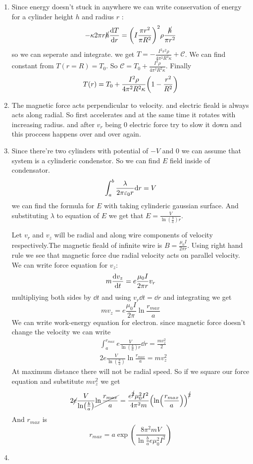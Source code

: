 \begin{sol}
    \begin{enumerate}[label=\textbf{(\alph*)}]
        \item 
        Since energy doesn't stuck in anywhere we can write conservation of energy for a cylinder height $h$ and radius $r$ : 
        $$-\kappa 2\pi r\cancel{h}\dv{T}{r}=\qty(I\frac{\pi r^2}{\pi R^2})^2\rho\frac{\cancel{h}}{\pi r^2}$$
        so we can seperate and integrate. we get $T=-\frac{I^2r^2\rho}{4\pi^2 R^4\kappa}+\mathcal{C}$. We can find constant from $T(r=R)=T_0$. So 
        $\mathcal{C}= T_0+\frac{I^2\rho}{4\pi^2 R^2\kappa}$. Finally $$T(r)=T_0+\frac{I^2\rho}{4\pi^2 R^2\kappa}\qty(1-\frac{r^2}{R^2})$$
        \item
        The magnetic force acts perpendicular to velocity. and electric fieald is always acts along radial. So first accelerates and at the same time it rotates with increasing radius. and after $v_r$ being 0 electric force try to slow it down and this proccess happens over and over again.
        \begin{center}
        
        \end{center}
        \item
        Since there're two cylinders with potential of $-V$ and 0 we can assume that system is a cylinderic condenstor. So we can find $E$ field inside of condensator.  
        $$\int_a^b \frac{\lambda}{2\pi \varepsilon_0 r}\dd r=V$$ we can find the formula for $E$ with taking cylinderic gaussian surface. And substituting $\lambda$ to equation of $E$ we get that $E=\frac{V}{\ln(\frac{b}{a})r}$. 

        Let $v_r$ and $v_z$ will be radial and along wire components of velocity respectively.The magnetic fieald of infinite wire is $B=\frac{\mu_0I}{2\pi r}$. Using right hand rule we see that magnetic force due radial velocity acts on parallel  velocity. We can write force equation for $v_z$: $$m\dv{v_z}{t}=e\frac{\mu_0I}{2\pi r}v_r$$
        multipliying both sides by $\dd t$ and using $v_r\dd t=\dd r$ and integrating we get $$mv_z=e\frac{\mu_0I}{2\pi}\ln\frac{r_{max}}{a}$$ We can write work-energy equation for electron. since magnetic force doesn't change the velocity we can write 
        \begin{align*}
        &\int_a^{r_{max}}e\frac{V}{\ln(\frac{b}{a})r}\dd r=\frac{mv_z^2}{2}\\
        &2e\frac{V}{\ln(\frac{b}{a})}\ln\frac{r_{max}}{a}=mv_z^2
        \end{align*}
        At maximum distance there will not be radial speed. So if we square our force equation and substitute $mv_z^2$ we get
        $$2\cancel{e}\frac{V}{\ln(\frac{b}{a})}\cancel{\ln\frac{r_{max}}{a}}=\frac{e^{\cancel{2}}\mu_0^2I^2}{4\pi^2m}\qty(\ln(\frac{r_{max}}{a}))^{\cancel{2}}$$
        And $r_{max}$ is $$r_{max}=a\exp(\frac{8\pi^2mV}{\ln\frac{b}{a}e\mu_0^2I^2})$$
        \item
        

\end{enumerate}
\end{sol}

